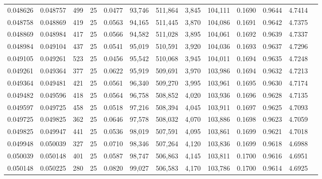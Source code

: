 \begin{tabular}{rrrrrrrrrrrrr}
0.048626 & 0.048757 &   499 &  25 &                                     0.0477 &  93,746 & 511,864 &   3,845 & 104,111 & 0.1690 & 0.9644 & 4.7414 \\
0.048758 & 0.048869 &   419 &  25 &                                     0.0563 &  94,165 & 511,445 &   3,870 & 104,086 & 0.1691 & 0.9642 & 4.7375 \\
0.048869 & 0.048984 &   417 &  25 &                                     0.0566 &  94,582 & 511,028 &   3,895 & 104,061 & 0.1692 & 0.9639 & 4.7337 \\
0.048984 & 0.049104 &   437 &  25 &                                     0.0541 &  95,019 & 510,591 &   3,920 & 104,036 & 0.1693 & 0.9637 & 4.7296 \\
0.049105 & 0.049261 &   523 &  25 &                                     0.0456 &  95,542 & 510,068 &   3,945 & 104,011 & 0.1694 & 0.9635 & 4.7248 \\
0.049261 & 0.049364 &   377 &  25 &                                     0.0622 &  95,919 & 509,691 &   3,970 & 103,986 & 0.1694 & 0.9632 & 4.7213 \\
0.049364 & 0.049481 &   421 &  25 &                                     0.0561 &  96,340 & 509,270 &   3,995 & 103,961 & 0.1695 & 0.9630 & 4.7174 \\
0.049482 & 0.049596 &   418 &  25 &                                     0.0564 &  96,758 & 508,852 &   4,020 & 103,936 & 0.1696 & 0.9628 & 4.7135 \\
0.049597 & 0.049725 &   458 &  25 &                                     0.0518 &  97,216 & 508,394 &   4,045 & 103,911 & 0.1697 & 0.9625 & 4.7093 \\
0.049725 & 0.049825 &   362 &  25 &                                     0.0646 &  97,578 & 508,032 &   4,070 & 103,886 & 0.1698 & 0.9623 & 4.7059 \\
0.049825 & 0.049947 &   441 &  25 &                                     0.0536 &  98,019 & 507,591 &   4,095 & 103,861 & 0.1699 & 0.9621 & 4.7018 \\
0.049948 & 0.050039 &   327 &  25 &                                     0.0710 &  98,346 & 507,264 &   4,120 & 103,836 & 0.1699 & 0.9618 & 4.6988 \\
0.050039 & 0.050148 &   401 &  25 &                                     0.0587 &  98,747 & 506,863 &   4,145 & 103,811 & 0.1700 & 0.9616 & 4.6951 \\
0.050148 & 0.050225 &   280 &  25 &                                     0.0820 &  99,027 & 506,583 &   4,170 & 103,786 & 0.1700 & 0.9614 & 4.6925 \\

\end{tabular}
